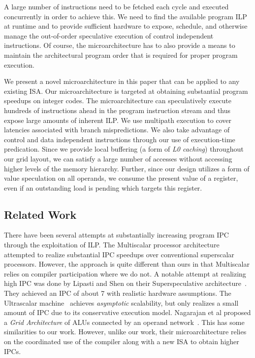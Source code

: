 \documentclass[10pt,twocolumn,dvips]{article}
\begin{document}
A large number of instructions need to be fetched
each cycle and executed concurrently in order to achieve this.
We need to find the available program ILP at runtime and to 
provide sufficient hardware to expose, schedule,
and otherwise manage the out-of-order speculative execution of
control independent instructions.
Of course, the microarchitecture has to also provide a means
to maintain the architectural program order that
is required for proper program execution.

We present a novel microarchitecture in this paper that can
be applied to any existing ISA.  Our microarchitecture
is targeted at obtaining
substantial program speedups on integer codes.
The microarchitecture can speculatively execute hundreds
of instructions ahead in the program instruction stream and
thus expose large amounts of inherent ILP.
We use multipath execution to cover latencies associated
with branch mispredictions.
We also take advantage of control
and data independent instructions through our use of
execution-time predication.
Since we provide local buffering (a form of {\em L0 caching}) throughout 
our grid layout, we can satisfy a large number of accesses without
accessing higher levels of the memory hierarchy.  Further, since 
our design utilizes a form of value speculation on all operands, we consume 
the present value of a register, even if an outstanding load is pending
which targets this register.
%
\subsection{Related Work}
%
There have been several attempts at substantially increasing
program IPC through the exploitation of ILP.
The Multiscalar processor architecture \cite{Soh95}
attempted 
to realize substantial IPC speedups over conventional superscalar
processors.  However, the approach is quite different than ours 
in that Multiscalar relies on compiler participation where we do not.
A notable attempt at realizing high IPC was done by
Lipasti and Shen on their Superspeculative
architecture~\cite{Lip97}.  They achieved an IPC of
about 7 with realistic hardware assumptions.
The Ultrascalar machine~\cite{Hen00}
achieves {\em asymptotic} scalability,
but only realizes a small amount of IPC due to its 
conservative execution model.
Nagarajan et al proposed a {\em Grid Architecture} of ALUs
connected by an operand network~\cite{Nag01}.  
This has some similarities to our work.
However, unlike our work, their microarchitecture
relies on the coordinated use of the compiler along with
a new ISA to obtain higher IPCs.
\end{document}
